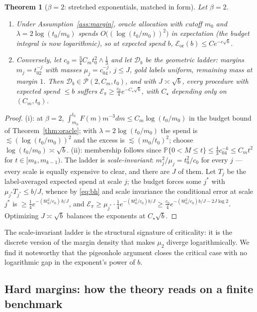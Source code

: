 \documentclass[11pt]{article}
\newtheorem{theorem}{Theorem}
\newcommand{\D}{\mathcal D}
\newcommand{\Pp}{\mathbb P}
\newcommand{\class}{\mathcal P}
\begin{document}
\begin{theorem}[$\beta=2$: stretched exponentials, matched in form]
\label{thm:beta2}
Let $\beta=2$.
\begin{enumerate}
\item[(i)] Under Assumption~\ref{ass:margin}, oracle allocation with
cutoff $m_0$ and $\lambda=2\log(t_0/m_0)$ spends
$O\big((\log(t_0/m_0))^2\big)$ in expectation (the budget integral is now
logarithmic), so at expected spend $b$,
$\mathcal E_{\mathrm{or}}(b)\le Ce^{-c\sqrt b}$.
\item[(ii)] Conversely, let $c_0=\frac34C_mt_0^2\wedge\frac13$ and let
$\D_b$ be the \emph{geometric ladder}: margins $m_j=t_02^{-j}$ with masses
$\mu_j=c_04^{-j}$, $j\le J$, gold labels uniform, remaining mass at margin
$1$.  Then $\D_b\in\class(2,C_m,t_0)$, and with
$J\asymp\sqrt b$, every procedure with expected spend $\le b$ suffers
$\mathcal E_\pi\ge\frac{c_0}{4}e^{-C_\star\sqrt b}$, with $C_\star$
depending only on $(C_m,t_0)$.
\end{enumerate}
\end{theorem}

\begin{proof}
(i): at $\beta=2$,
$\int_{m_0}^{t_0}F(m)m^{-3}dm\le C_m\log(t_0/m_0)$ in the budget bound of
Theorem~\ref{thm:oracle}; with $\lambda=2\log(t_0/m_0)$ the spend is
$\lesssim(\log(t_0/m_0))^2$ and the excess is $\lesssim(m_0/t_0)^2$; choose
$\log(t_0/m_0)\asymp\sqrt b$.  (ii): membership follows since
$\Pp\{0<M\le t\}\le\frac43c_04^{-k}\le C_mt^2$ for $t\in[m_k,m_{k-1})$.
The ladder is \emph{scale-invariant}: $m_j^2/\mu_j=t_0^2/c_0$ for every
$j$ --- every scale is equally expensive to clear, and there are $J$ of
them.  Let $T_j$ be the label-averaged expected spend at scale $j$; the
budget forces some $j^\ast$ with $\mu_{j^\ast}T_{j^\ast}\le b/J$, whence by
\eqref{eq:bh} and scale invariance the conditional error at scale $j^\ast$
is $\ge\frac14e^{-(8t_0^2/c_0)\,b/J}$, and
$\mathcal E_\pi\ge\mu_{j^\ast}\cdot\frac14e^{-(8t_0^2/c_0)b/J}
\ge\frac{c_0}4e^{-(8t_0^2/c_0)b/J-2J\log2}$.  Optimizing $J\asymp\sqrt b$
balances the exponents at $C_\star\sqrt b$.
\end{proof}

The scale-invariant ladder is the structural signature of criticality: it
is the discrete version of the margin density that makes $\mu_2$ diverge
logarithmically.  We find it noteworthy that the pigeonhole argument
closes the critical case with no logarithmic gap in the exponent's power
of $b$.

\subsection{Hard margins: how the theory reads on a finite benchmark}
\label{sec:hard-margin}
\end{document}
